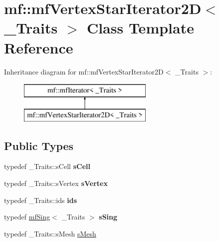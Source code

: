 \hypertarget{classmf_1_1mfVertexStarIterator2D}{
\section{mf::mfVertexStarIterator2D$<$ \_\-Traits $>$ Class Template Reference}
\label{classmf_1_1mfVertexStarIterator2D}
}
Inheritance diagram for mf::mfVertexStarIterator2D$<$ \_\-Traits $>$:\begin{figure}[H]
\begin{center}
\leavevmode
\includegraphics[height=2.000000cm]{classmf_1_1mfVertexStarIterator2D}
\end{center}
\end{figure}
\subsection*{Public Types}
\begin{DoxyCompactItemize}
\item 
\hypertarget{classmf_1_1mfVertexStarIterator2D_a96630336587c42a2d07492893180a46b}{
typedef \_\-Traits::sCell {\bfseries sCell}}
\label{classmf_1_1mfVertexStarIterator2D_a96630336587c42a2d07492893180a46b}

\item 
\hypertarget{classmf_1_1mfVertexStarIterator2D_a4d0bb9728998b79e239956f3deb70708}{
typedef \_\-Traits::sVertex {\bfseries sVertex}}
\label{classmf_1_1mfVertexStarIterator2D_a4d0bb9728998b79e239956f3deb70708}

\item 
\hypertarget{classmf_1_1mfVertexStarIterator2D_a4ea6ceb160b2e1817e4a98c0bf434819}{
typedef \_\-Traits::ids {\bfseries ids}}
\label{classmf_1_1mfVertexStarIterator2D_a4ea6ceb160b2e1817e4a98c0bf434819}

\item 
\hypertarget{classmf_1_1mfVertexStarIterator2D_a778a191ed8efe2e818a01caa69079817}{
typedef \hyperlink{classmf_1_1mfSing}{mfSing}$<$ \_\-Traits $>$ {\bfseries sSing}}
\label{classmf_1_1mfVertexStarIterator2D_a778a191ed8efe2e818a01caa69079817}

\item 
typedef \_\-Traits::sMesh \hyperlink{classmf_1_1mfVertexStarIterator2D_a25f97b24c35482b8677e4672d70687cf}{sMesh}
\end{DoxyCompactItemize}
